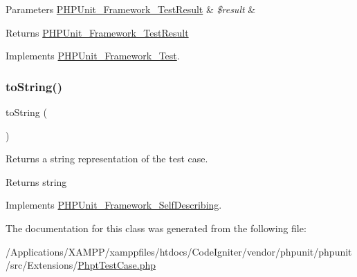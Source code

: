 \begin{DoxyParams}[1]{Parameters}
\mbox{\hyperlink{class_p_h_p_unit___framework___test_result}{P\+H\+P\+Unit\+\_\+\+Framework\+\_\+\+Test\+Result}} & {\em \$result} & \\
\hline
\end{DoxyParams}
\begin{DoxyReturn}{Returns}
\mbox{\hyperlink{class_p_h_p_unit___framework___test_result}{P\+H\+P\+Unit\+\_\+\+Framework\+\_\+\+Test\+Result}} 
\end{DoxyReturn}


Implements \mbox{\hyperlink{interface_p_h_p_unit___framework___test_aba2e5a83092b40735a7a61c572cd6256}{P\+H\+P\+Unit\+\_\+\+Framework\+\_\+\+Test}}.

\mbox{\label{class_p_h_p_unit___extensions___phpt_test_case_a5558c5d549f41597377fa1ea8a1cefa3}} 
\subsubsection{\texorpdfstring{to\+String()}{toString()}}
{\footnotesize\ttfamily to\+String (\begin{DoxyParamCaption}{ }\end{DoxyParamCaption})}

Returns a string representation of the test case.

\begin{DoxyReturn}{Returns}
string 
\end{DoxyReturn}


Implements \mbox{\hyperlink{interface_p_h_p_unit___framework___self_describing_a5558c5d549f41597377fa1ea8a1cefa3}{P\+H\+P\+Unit\+\_\+\+Framework\+\_\+\+Self\+Describing}}.



The documentation for this class was generated from the following file\+:\begin{DoxyCompactItemize}
\item 
/\+Applications/\+X\+A\+M\+P\+P/xamppfiles/htdocs/\+Code\+Igniter/vendor/phpunit/phpunit/src/\+Extensions/\mbox{\hyperlink{_phpt_test_case_8php}{Phpt\+Test\+Case.\+php}}\end{DoxyCompactItemize}
